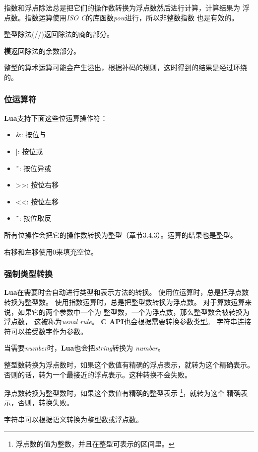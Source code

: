 \documentclass{ctexart}
\begin{document}
指数和浮点除法总是把它们的操作数转换为浮点数然后进行计算，计算结果为
浮点数。指数运算使用\emph{ISO C}的库函数\emph{pow}进行，所以非整数指数
也是有效的。

整型除法(//)返回除法的商的部分。

\textbf{模}返回除法的余数部分。

整型的算术运算可能会产生溢出，根据补码的规则，这时得到的结果是经过环绕的。

\subsubsection{位运算符}

\textbf{Lua}支持下面这些位运算操作符：

\begin{itemize}
\item \&: 按位与
\item |: 按位或
\item \~\ : 按位异或
\item >>: 按位右移
\item <<: 按位左移
\item \~\ : 按位取反
\end{itemize}

所有位操作会把它的操作数转换为整型（章节3.4.3）。运算的结果也是整型。

右移和左移使用0来填充空位。

\subsubsection{强制类型转换}

\textbf{Lua}在需要时会自动进行类型和表示方法的转换。
使用位运算时，总是把浮点数转换为整型数。
使用指数运算时，总是把整型数转换为浮点数。
对于算数运算来说，如果它的两个参数中一个为
整型数，一个为浮点数，那么整型数会被转换为浮点数，
这被称为\emph{usual rule}。
\textbf{C API}也会根据需要转换参数类型。
字符串连接符可以接受数字作为参数。

当需要\emph{number}时，\textbf{Lua}也会把\emph{string}转换为
\emph{number}。

整型数转换为浮点数时，如果这个数值有精确的浮点表示，就转为这个精确表示。
否则的话，转为一个最接近的浮点表示。这种转换不会失败。

浮点数转换为整型数时，如果这个数值有精确的整型表示
\footnote{浮点数的值为整数，并且在整型可表示的区间里。}，就转为这个
精确表示，否则，转换失败。

字符串可以根据语义转换为整型数或浮点数。
\end{document}
